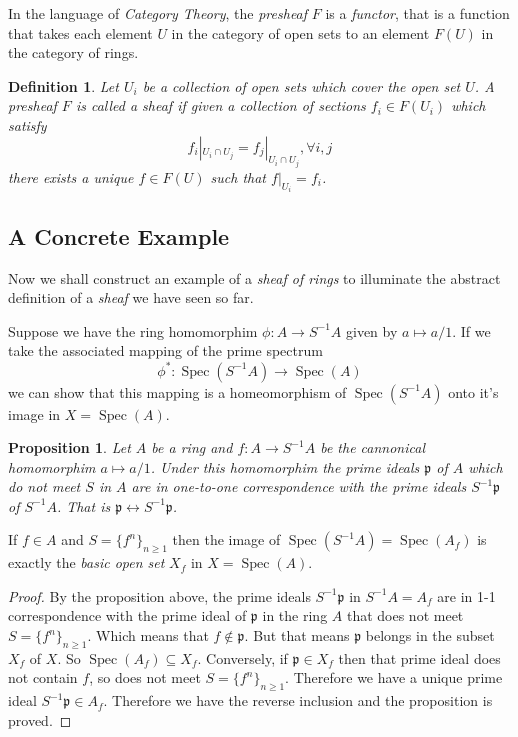 \documentclass[]{report}
\newtheorem{prop}[theorem]{Proposition}
\newtheorem{defn}[theorem]{Definition}
\DeclareMathOperator\Spec{Spec}
\newcommand\byS{S^{-1}}
\begin{document}
In the language of \textit{Category Theory}, the \textit{presheaf} $F$ is a \textit{functor}, that is a function that takes each element $U$ in the category of open sets to an element $F(U)$ in the category of rings.

\begin{defn}
    Let  $U_i$ be a collection of open sets which cover the open set $U$. A presheaf $F$ is called a sheaf if given a collection of sections $f_i \in F(U_i)$ which satisfy  
    $$f_i |_{U_i \cap U_j} = f_j |_{U_i \cap U_j}, \forall i,j$$
   there exists a unique $f \in F(U)$ such that $f|_{U_i} = f_i$.
\end{defn}



\subsection{A Concrete Example}

Now we shall construct an example of a \textit{sheaf of rings} to illuminate the abstract definition of a \textit{sheaf} we have seen so far.

Suppose we have the ring homomorphim $\phi: A \rightarrow \byS A$ given by $a \mapsto a/1$. If we take the associated mapping of the prime spectrum
    $$\phi^* : \Spec(\byS A) \rightarrow \Spec(A)$$
    we can show that this mapping is a homeomorphism of $\Spec(\byS A)$ onto it's image in $X = \Spec(A)$. 

\begin{prop}
Let $A$ be a ring and $f: A \rightarrow \byS A$ be the cannonical homomorphim $a \mapsto a/1$. Under this homomorphim the prime ideals $\mathfrak{p}$ of $A$ which do not meet $S$ in $A$ are in one-to-one correspondence with the prime ideals $\byS \mathfrak{p}$ of $\byS A$. That is $\mathfrak{p} \leftrightarrow \byS \mathfrak{p}$.
\end{prop}


If $f \in A$ and $S = \{f^n\}_{n\geq1}$ then the image of $\Spec(\byS A) = \Spec(A_f)$ is exactly the \textit{basic open set} $X_f$ in $X = \Spec(A)$.

\begin{proof}
    By the proposition above, the prime ideals $\byS \mathfrak{p}$ in 
$\byS A = A_f$ are in 1-1 correspondence with the prime ideal of $\mathfrak{p}$ in the ring $A$ that does not meet $S = \{f^n\}_{n \geq 1}$. Which means that $f \not \in \mathfrak{p}$. But that means $\mathfrak{p}$ belongs in the subset $X_f$ of $X$. So $\Spec(A_f) \subseteq X_f$. Conversely, if $\mathfrak{p} \in X_f$ then that prime ideal does not contain $f$, so does not meet $S = \{f^n\}_{n \geq 1}$. Therefore we have a unique prime ideal $\byS \mathfrak{p} \in A_f$. Therefore we have the reverse inclusion and the proposition is proved.
\end{proof}
\end{document}
